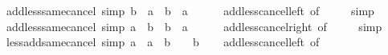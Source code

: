 \begin{isabellebody}
\isanewline
\isanewline
{}\isamarkupfalse%
\ add{\isacharunderscore}{\kern0pt}less{\isacharunderscore}{\kern0pt}same{\isacharunderscore}{\kern0pt}cancel{}\ {\isacharbrackleft}{\kern0pt}simp{\isacharbrackright}{\kern0pt}{\isacharcolon}{\kern0pt}\ {\isachardoublequoteopen}b\ {\isacharplus}{\kern0pt}\ a\ {\isacharless}{\kern0pt}\ b\ {\isasymlongleftrightarrow}\ a\ {\isacharless}{\kern0pt}\ {}{\isachardoublequoteclose}\isanewline
%
\isadelimproof
\ \ %
\endisadelimproof
%
\isatagproof
{}\isamarkupfalse%
\ add{\isacharunderscore}{\kern0pt}less{\isacharunderscore}{\kern0pt}cancel{\isacharunderscore}{\kern0pt}left\ {\isacharbrackleft}{\kern0pt}of\ {\isacharunderscore}{\kern0pt}\ {\isacharunderscore}{\kern0pt}\ {}{\isacharbrackright}{\kern0pt}\ \isamarkupfalse%
\ simp%
\endisatagproof
{\isafoldproof}%
%
\isadelimproof
\isanewline
%
\endisadelimproof
\isanewline
{}\isamarkupfalse%
\ add{\isacharunderscore}{\kern0pt}less{\isacharunderscore}{\kern0pt}same{\isacharunderscore}{\kern0pt}cancel{}\ {\isacharbrackleft}{\kern0pt}simp{\isacharbrackright}{\kern0pt}{\isacharcolon}{\kern0pt}\ {\isachardoublequoteopen}a\ {\isacharplus}{\kern0pt}\ b\ {\isacharless}{\kern0pt}\ b\ {\isasymlongleftrightarrow}\ a\ {\isacharless}{\kern0pt}\ {}{\isachardoublequoteclose}\isanewline
%
\isadelimproof
\ \ %
\endisadelimproof
%
\isatagproof
{}\isamarkupfalse%
\ add{\isacharunderscore}{\kern0pt}less{\isacharunderscore}{\kern0pt}cancel{\isacharunderscore}{\kern0pt}right\ {\isacharbrackleft}{\kern0pt}of\ {\isacharunderscore}{\kern0pt}\ {\isacharunderscore}{\kern0pt}\ {}{\isacharbrackright}{\kern0pt}\ \isamarkupfalse%
\ simp%
\endisatagproof
{\isafoldproof}%
%
\isadelimproof
\isanewline
%
\endisadelimproof
\isanewline
{}\isamarkupfalse%
\ less{\isacharunderscore}{\kern0pt}add{\isacharunderscore}{\kern0pt}same{\isacharunderscore}{\kern0pt}cancel{}\ {\isacharbrackleft}{\kern0pt}simp{\isacharbrackright}{\kern0pt}{\isacharcolon}{\kern0pt}\ {\isachardoublequoteopen}a\ {\isacharless}{\kern0pt}\ a\ {\isacharplus}{\kern0pt}\ b\ {\isasymlongleftrightarrow}\ {}\ {\isacharless}{\kern0pt}\ b{\isachardoublequoteclose}\isanewline
%
\isadelimproof
\ \ %
\endisadelimproof
%
\isatagproof
{}\isamarkupfalse%
\ add{\isacharunderscore}{\kern0pt}less{\isacharunderscore}{\kern0pt}cancel{\isacharunderscore}{\kern0pt}left\ {\isacharbrackleft}{\kern0pt}of\ {\isacharunderscore}{\kern0pt}\ {}{\isacharbrackright}{\kern0pt}\ \isamarkupfalse%

\end{isabellebody}
